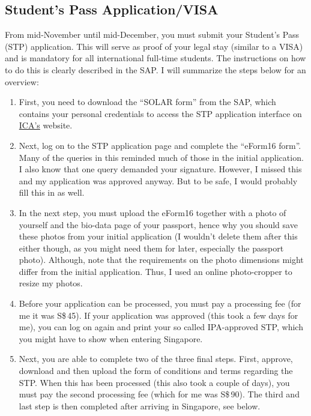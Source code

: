 \subsection*{Student's Pass Application/VISA}
{}
From mid-November until mid-December, you must submit your Student's Pass (STP) application. This will serve as proof of your legal stay (similar to a VISA) and is mandatory for all international full-time students. The instructions on how to do this is clearly described in the SAP. I will summarize the steps below for an overview:
\begin{enumerate}
    \item First, you need to download the ``SOLAR form'' from the SAP, which contains your personal credentials to access the STP application interface on \href{https://eservices.ica.gov.sg/solar/index.xhtml}{ICA's} website. 
    \item Next, log on to the STP application page and complete the ``eForm16 form''. Many of the queries in this reminded much of those in the initial application. I also know that one query demanded your signature. However, I missed this and my application was approved anyway. But to be safe, I would probably fill this in as well.
    \item In the next step, you must upload the eForm16 together with a photo of yourself and the bio-data page of your passport, hence why you should save these photos from your initial application (I wouldn't delete them after this either though, as you might need them for later, especially the passport photo). Although, note that the requirements on the photo dimensions might differ from the initial application. Thus, I used an online photo-cropper to resize my photos. 
    \item Before your application can be processed, you must pay a processing fee (for me it was S\$\,45). If your application was approved (this took a few days for me), you can log on again and print your so called IPA-approved STP, which you might have to show when entering Singapore.
    \item Next, you are able to complete two of the three final steps. First, approve, download and then upload the form of conditions and terms regarding the STP. When this has been processed (this also took a couple of days), you must pay the second processing fee (which for me was S\$\,90). The third and last step is then completed after arriving in Singapore, see below.
\end{enumerate}
